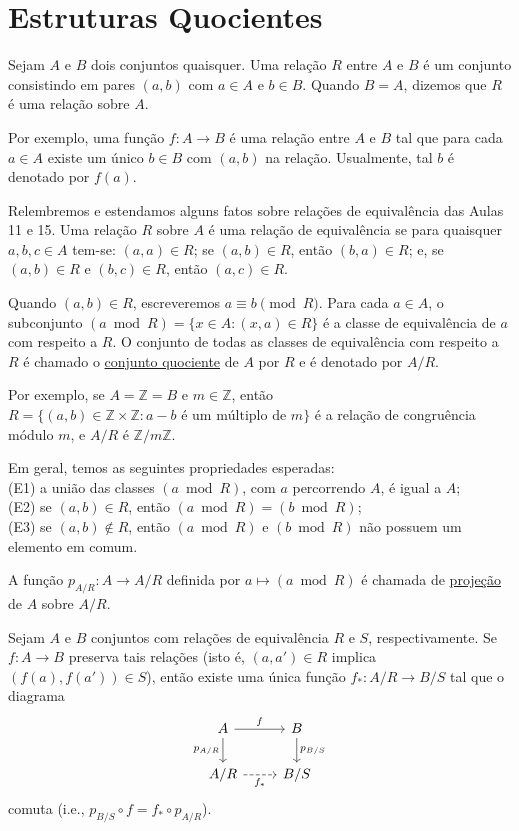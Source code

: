 \section{Estruturas Quocientes}

Sejam $A$ e $B$ dois conjuntos quaisquer. Uma relação $R$ entre $A$ e $B$ é um conjunto 
consistindo em pares $(a,b)$ com $a \in A$ e $b \in B$. Quando $B = A$, dizemos que $R$ 
é uma relação sobre $A$.

Por exemplo, uma função $f \colon A \to B$ é uma relação entre $A$ e $B$ tal que para 
cada $a \in A$ existe um único $b \in B$ com $(a,b)$ na relação. Usualmente, tal $b$ 
é denotado por $f(a)$.

Relembremos e estendamos alguns fatos sobre relações de equivalência das Aulas 11 e 15. 
Uma relação $R$ sobre $A$ é uma relação de equivalência se para quaisquer $a,b,c \in A$ tem-se:
$(a,a) \in R$; se $(a,b) \in R$, então $(b,a) \in R$; e, se $(a,b) \in R$ e $(b,c) \in R$, então $(a,c) \in R$.

Quando $(a,b) \in R$, escreveremos $a \equiv b \pmod{R}$. Para cada $a \in A$, o subconjunto
$(a \bmod R) = \{x \in A : (x,a) \in R\}$ é a classe de equivalência de $a$ com respeito a 
$R$. O conjunto de todas as classes de equivalência com respeito a $R$ é chamado o \underline{conjunto quociente} 
de $A$ por $R$ e é denotado por $A/R$.

Por exemplo, se $A = \mathbb{Z} = B$ e $m \in \mathbb{Z}$, então
$R = \{(a,b) \in \mathbb{Z} \times \mathbb{Z} : a - b \text{ é um múltiplo de } m\}$
é a relação de congruência módulo $m$, e $A/R$ é $\mathbb{Z}/m\mathbb{Z}$.

Em geral, temos as seguintes propriedades esperadas: \\
(E1) a união das classes $(a \bmod R)$, com $a$ percorrendo $A$, é igual a $A$; \\
(E2) se $(a,b) \in R$, então $(a \bmod R) = (b \bmod R)$; \\
(E3) se $(a,b) \notin R$, então $(a \bmod R)$ e $(b \bmod R)$ não possuem um elemento em comum.

A função $p_{A/R} : A \to A/R$ definida por $a \longmapsto (a \bmod R)$
é chamada de \underline{projeção} de $A$ sobre $A/R$.

\begin{proposicao}
Sejam $A$ e $B$ conjuntos com relações de equivalência $R$ e $S$, respectivamente. Se $f : A \to B$
preserva tais relações (isto é, $(a,a') \in R$ implica $(f(a),f(a')) \in S$), então existe uma única função
$f_{*} : A/R \to B/S$ tal que o diagrama 
\[
\begin{tikzcd}
A \arrow[r, "f"] \arrow[d, "p_{A/R}"'] 
  & B \arrow[d, "p_{B/S}"] \\
A/R \arrow[r, dashed, "f_*"'] 
  & B/S
\end{tikzcd}
\]
comuta (i.e., $p_{B/S} \circ f = f_{*} \circ p_{A/R}$).
\end{proposicao}

